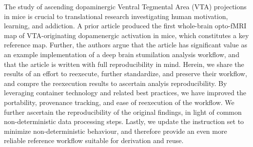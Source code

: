 The study of ascending dopaminergic Ventral Tegmental Area (VTA) projections in mice is crucial to translational research investigating human motivation, learning, and addiction. 
A prior article produced the first whole-brain opto-fMRI map of VTA-originating dopamenergic activation in mice, which constitutes a key reference map.
Further, the authors argue that the article has significant value as an example implementation of a deep brain stumilation analysis workflow, and that the article is written with full reproducibility in mind.
Herein, we share the results of an effort to reexecute, further standardize, and preserve their workflow, and compre the reexecution results to ascertain analyis reproducibility.
By leveraging container technology and related best practices, we have improved the portability, provenance tracking, and ease of reexecution of the workflow. 
We further ascertain the reproducibility of the original findings, in light of common non-deterministic data processing steps.
Lastly, we update the instruction set to minimize non-deterministic behaviour, and therefore provide an even more reliable reference workflow suitable for derivation and reuse. 
